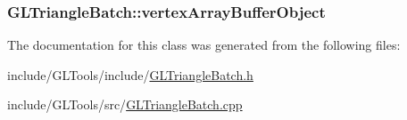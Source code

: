 \hypertarget{class_g_l_triangle_batch_a72f1061415939f50c49b3cf35a1dccd4}{
\subsubsection[{vertex\-Array\-Buffer\-Object}]{ G\-L\-Triangle\-Batch\-::vertex\-Array\-Buffer\-Object\hspace{0.3cm}{\ttfamily [protected]}}}\label{class_g_l_triangle_batch_a72f1061415939f50c49b3cf35a1dccd4}


The documentation for this class was generated from the following files\-:\begin{DoxyCompactItemize}
\item 
include/\-G\-L\-Tools/include/\hyperlink{_g_l_triangle_batch_8h}{G\-L\-Triangle\-Batch.\-h}\item 
include/\-G\-L\-Tools/src/\hyperlink{_g_l_triangle_batch_8cpp}{G\-L\-Triangle\-Batch.\-cpp}\end{DoxyCompactItemize}
